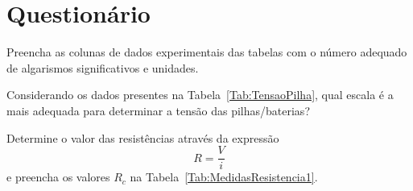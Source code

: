 
\vspace{15mm}

\begin{fullwidth}
\noindent{}
\vspace{5mm}

\noindent{}

\noindent{}

\noindent{}

\noindent{}

\noindent{}
\end{fullwidth}

\vspace{5mm}

\section{Questionário}

\begin{question}[type={exam}]{2.5}
Preencha as colunas de dados experimentais das tabelas com o número adequado de algarismos significativos e unidades.
\end{question}

\begin{question}[type={exam}]{2.5}
Considerando os dados presentes na Tabela~\ref{Tab:TensaoPilha}, qual escala é a mais adequada para determinar a tensão das pilhas/baterias?
\end{question}

\begin{question}[type={exam}]{2.5}
Determine o valor das resistências através da expressão
\begin{equation}
    R = \frac{V}{i}
\end{equation}
%
e preencha os valores $R_c$ na Tabela~\ref{Tab:MedidasResistencia1}.
\end{question}

